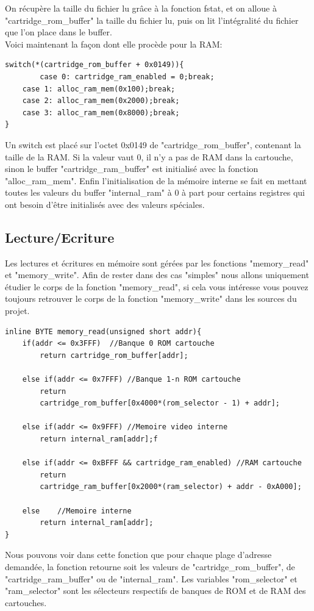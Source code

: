 \documentclass{report}
\begin{document}
On récupère la taille du fichier lu grâce à la fonction fstat, et on alloue à "cartridge\_rom\_buffer" la taille du fichier lu, puis on lit l'intégralité du fichier que l'on place dans le buffer.\\
Voici maintenant la façon dont elle procède pour la RAM:
\begin{lstlisting}
switch(*(cartridge_rom_buffer + 0x0149)){
       	case 0: cartridge_ram_enabled = 0;break;
	case 1: alloc_ram_mem(0x100);break;
	case 2: alloc_ram_mem(0x2000);break;
	case 3: alloc_ram_mem(0x8000);break;
}
\end{lstlisting}
Un switch est placé sur l'octet 0x0149 de "cartridge\_rom\_buffer", contenant la taille de la RAM. Si la valeur vaut 0, il n'y a pas de RAM dans la cartouche, sinon le buffer "cartridge\_ram\_buffer" est initialisé avec la fonction "alloc\_ram\_mem".
Enfin l'initialisation de la mémoire interne se fait en mettant toutes les valeurs du buffer "internal\_ram" à 0 à part pour certains registres qui ont besoin d'être initialisés avec des valeurs spéciales.
\subsection{Lecture/Ecriture}
Les lectures et écritures en mémoire sont gérées par les fonctions "memory\_read" et "memory\_write". Afin de rester dans des cas "simples" nous allons uniquement étudier le corps de la fonction "memory\_read", si cela vous intéresse vous pouvez toujours retrouver le corps de la fonction "memory\_write" dans les sources du projet.
\begin{lstlisting}
inline BYTE memory_read(unsigned short addr){
	if(addr <= 0x3FFF) 	//Banque 0 ROM cartouche
		return cartridge_rom_buffer[addr];

	else if(addr <= 0x7FFF) //Banque 1-n ROM cartouche
		return 
		cartridge_rom_buffer[0x4000*(rom_selector - 1) + addr];

	else if(addr <= 0x9FFF) //Memoire video interne
		return internal_ram[addr];f

	else if(addr <= 0xBFFF && cartridge_ram_enabled) //RAM cartouche
		return 
		cartridge_ram_buffer[0x2000*(ram_selector) + addr - 0xA000];

	else 	//Memoire interne
		return internal_ram[addr];
}
\end{lstlisting}
Nous pouvons voir dans cette fonction que pour chaque plage d'adresse demandée, la fonction retourne soit les valeurs de "cartridge\_rom\_buffer", de "cartridge\_ram\_buffer" ou de "internal\_ram".
Les variables "rom\_selector" et "ram\_selector" sont les sélecteurs respectifs de banques de ROM et de RAM des cartouches.
\end{document}
